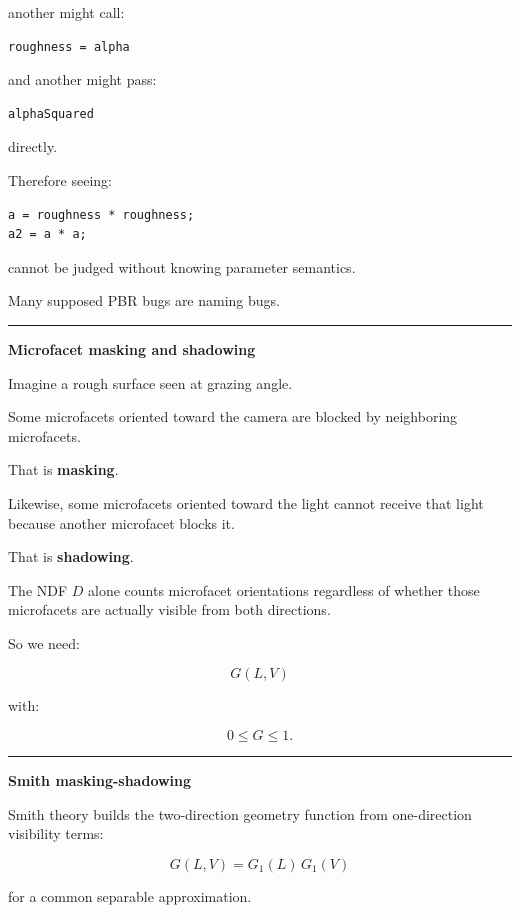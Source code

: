 another might call:

\begin{verbatim}
roughness = alpha
\end{verbatim}

and another might pass:

\begin{verbatim}
alphaSquared
\end{verbatim}

directly.

Therefore seeing:

\begin{verbatim}
a = roughness * roughness;
a2 = a * a;
\end{verbatim}

cannot be judged without knowing parameter semantics.

Many supposed PBR bugs are naming bugs.

\begin{center}\rule{0.5\linewidth}{0.5pt}\end{center}

\textbf{Microfacet masking and shadowing}

Imagine a rough surface seen at grazing angle.

Some microfacets oriented toward the camera are blocked by neighboring microfacets.

That is \textbf{masking}.

Likewise, some microfacets oriented toward the light cannot receive that light because another microfacet blocks it.

That is \textbf{shadowing}.

The NDF \(D\) alone counts microfacet orientations regardless of whether those microfacets are actually visible from both directions.

So we need:

\[
\boxed{
G(L,V)
}
\]

with:

\[
0\le G\le1.
\]

\begin{center}\rule{0.5\linewidth}{0.5pt}\end{center}

\textbf{Smith masking-shadowing}

Smith theory builds the two-direction geometry function from one-direction visibility terms:

\[
\boxed{
G(L,V)
=
G_1(L)\,G_1(V)
}
\]

for a common separable approximation.

